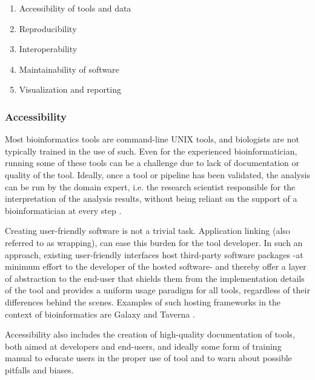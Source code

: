 \begin{justify}
\begin{enumerate}
    \itemsep-0.5em
    \item Accessibility of tools and data %
    \item Reproducibility %
    \item Interoperability %
    \item Maintainability of software %
    \item Visualization and reporting
\end{enumerate}


\subsubsection{Accessibility}
Most bioinformatics tools are command-line UNIX \cite{url-unix} tools, and biologists are not typically trained in the use of such. Even for the experienced bioinformatician, running some of these tools can be a challenge due to lack of documentation or quality of the tool. Ideally, once a tool or pipeline has been validated, the analysis can be run by the domain expert, i.e. the research scientist responsible for the interpretation of the analysis results, without being reliant on the support of a bioinformatician at every step \cite{kumar2007bioinformatics}.

Creating user-friendly software is not a trivial task. Application linking (also referred to as wrapping), can ease this burden for the tool developer. In such an approach, existing user-friendly interfaces host third-party software packages -at minimum effort to the developer of the hosted software- and thereby offer a layer of abstraction to the end-user that shields them from the implementation details of the tool and provides a uniform usage paradigm for all tools, regardless of their differences behind the scenes. Examples of such hosting frameworks in the context of bioinformatics are Galaxy \cite{giardine2005galaxy,goecks2010galaxy} and Taverna \cite{oinn2004taverna}.

Accessibility also includes the creation of high-quality documentation of tools, both aimed at developers and end-users, and ideally some form of training manual to educate users in the proper use of tool and to warn about possible pitfalls and biases.


\end{justify}
